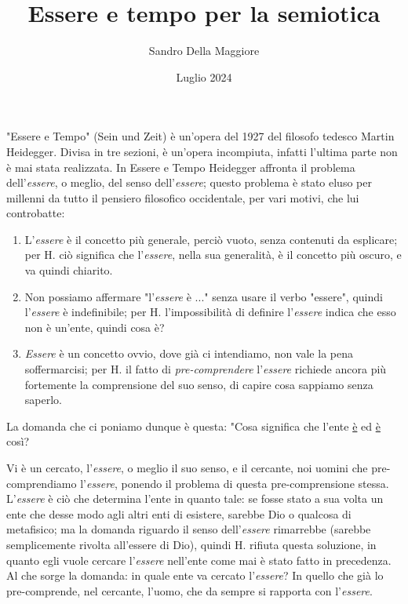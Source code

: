 \documentclass[a4paper,12pt,oneside]{article}%
\begin{document}
	\author{Sandro Della Maggiore}
	\title{Essere e tempo per la semiotica}
	\date{Luglio 2024}
	
	\maketitle


"Essere e Tempo" (Sein und Zeit) è un’opera del 1927 del filosofo tedesco Martin Heidegger. Divisa in tre sezioni, è un’opera incompiuta, infatti l’ultima parte non è mai stata realizzata. In Essere e Tempo Heidegger affronta il problema dell’\textit{essere}, o meglio, del senso dell'\textit{essere}; questo problema è stato eluso per millenni da tutto il pensiero filosofico occidentale, per vari motivi, che lui controbatte:

\begin{enumerate}
	\item L'\textit{essere} è il concetto più generale, perciò vuoto, senza contenuti da esplicare; per H. ciò significa che l'\textit{essere}, nella sua generalità, è il concetto più oscuro, e va quindi chiarito.
	\item Non possiamo affermare "l'\textit{essere} è ..." senza usare il verbo "essere", quindi l'\textit{essere} è indefinibile; per H. l'impossibilità di definire l'\textit{essere} indica che esso non è un'ente, quindi cosa è?
	\item \textit{Essere} è un concetto ovvio, dove già ci intendiamo, non vale la pena soffermarcisi; per H. il fatto di \textit{pre-comprendere} l'\textit{essere} richiede ancora più fortemente la comprensione del suo senso, di capire cosa sappiamo senza saperlo.
\end{enumerate}

La domanda che ci poniamo dunque è questa: "Cosa significa che l'ente \underline{è} ed \underline{è} così?

Vi è un cercato, l'\textit{essere}, o meglio il suo senso, e il cercante, noi uomini che pre-comprendiamo l'\textit{essere}, ponendo il problema di questa pre-comprensione stessa. L'\textit{essere} è ciò che determina l'ente in quanto tale: se fosse stato a sua volta un ente che desse modo agli altri enti di esistere, sarebbe Dio o qualcosa di metafisico; ma la domanda riguardo il senso dell'\textit{essere} rimarrebbe (sarebbe semplicemente rivolta all'essere di Dio), quindi H. rifiuta questa soluzione, in quanto egli vuole cercare l'\textit{essere} nell'ente come mai è stato fatto in precedenza. Al che sorge la domanda: in quale ente va cercato l'\textit{essere}? In quello che già lo pre-comprende, nel cercante, l'uomo, che da sempre si rapporta con l'\textit{essere}.
\end{document}
